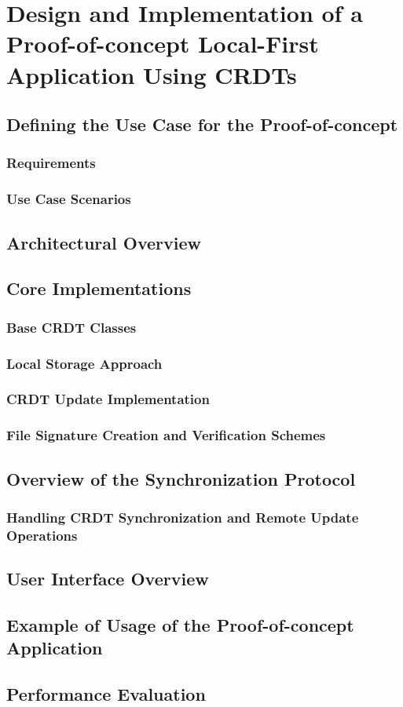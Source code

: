 \chapter{Design and Implementation of a Proof-of-concept Local-First Application Using CRDTs}

\section{Defining the Use Case for the Proof-of-concept}

\subsection{Requirements}

\subsection{Use Case Scenarios}

\section{Architectural Overview}

\section{Core Implementations}

\subsection{Base CRDT Classes}

\subsection{Local Storage Approach}

\subsection{CRDT Update Implementation}

\subsection{File Signature Creation and Verification Schemes}

\section{Overview of the Synchronization Protocol}

\subsection{Handling CRDT Synchronization and Remote Update Operations}

\section{User Interface Overview}

\section{Example of Usage of the Proof-of-concept Application}

\section{Performance Evaluation}